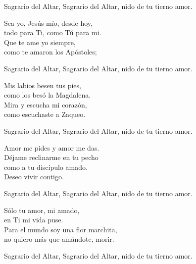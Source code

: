 \documentclass[12pt, letterpaper]{report}
\begin{document}
    \noindent
    Sagrario del Altar, Sagrario del Altar, nido de tu tierno amor.

    \noindent
    Sea yo, Jes\'us m\'io, desde hoy,\\
    todo para Ti, como T\'u para mi.\\
    Que te ame yo siempre,\\
    como te amaron los Ap\'ostoles;

    \noindent
    Sagrario del Altar, Sagrario del Altar, nido de tu tierno amor.

    \noindent
    Mis labios besen tus pies,\\
    como los bes\'o la Magdalena.\\
    Mira y escucha mi coraz\'on,\\
    como escuchaste a Zaqueo.

    \noindent
    Sagrario del Altar, Sagrario del Altar, nido de tu tierno amor.

    \noindent
    Amor me pides y amor me das.\\
    D\'ejame reclinarme en tu pecho\\
    como a tu disc\'ipulo amado.\\
    Deseo vivir contigo.

    \noindent
    Sagrario del Altar, Sagrario del Altar, nido de tu tierno amor.

    \noindent
    S\'olo tu amor, mi amado,\\
    en Ti mi vida puse.\\
    Para el mundo soy una flor marchita,\\
    no quiero m\'as que am\'andote, morir.

    \noindent
    Sagrario del Altar, Sagrario del Altar, nido de tu tierno amor.
    \clearpage

    {%
\parindent 0pt
\noindent
\ifx\preLilyPondExample \undefined
\else
  \expandafter\preLilyPondExample
\fi
\def\lilypondbook{}%
%
\ifx\postLilyPondExample \undefined
\else
  \expandafter\postLilyPondExample
\fi
}
    \clearpage

    {%
\parindent 0pt
\noindent
\ifx\preLilyPondExample \undefined
\else
  \expandafter\preLilyPondExample
\fi
\def\lilypondbook{}%
%
\ifx\postLilyPondExample \undefined
\else
  \expandafter\postLilyPondExample
\fi
}
    \clearpage

    {%
\parindent 0pt
\noindent
\ifx\preLilyPondExample \undefined
\else
  \expandafter\preLilyPondExample
\fi
\def\lilypondbook{}%
%
\ifx\postLilyPondExample \undefined
\else
  \expandafter\postLilyPondExample
\fi
}
    \clearpage
\end{document}
